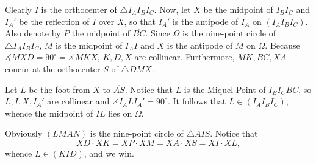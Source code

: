 Clearly $I$ is the orthocenter of $\triangle I_AI_BI_C$. Now, let $X$ be the midpoint of $\overline{I_BI_C}$ and $I_A'$ be the reflection of $I$ over $X$, so that $I_A'$ is the antipode of $I_A$ on $(I_AI_BI_C)$. Also denote by $P$ the midpoint of $\overline{BC}$. Since $\Omega$ is the nine-point circle of $\triangle I_AI_BI_C$, $M$ is the midpoint of $\overline{I_AI}$ and $X$ is the antipode of $M$ on $\Omega$. Because $\measuredangle MXD=90^\circ=\measuredangle MKX$, $K,D,X$ are collinear. Furthermore, $\overline{MK},\overline{BC},\overline{XA}$ concur at the orthocenter $S$ of $\triangle DMX$.

Let $L$ be the foot from $X$ to $\overline{AS}$. Notice that $L$ is the Miquel Point of $I_BI_CBC$, so $L,I,X,I_A'$ are collinear and $\measuredangle I_ALI_A'=90^\circ$. It follows that $L\in(I_AI_BI_C)$, whence the midpoint of $\overline{IL}$ lies on $\Omega$.

Obviously $(LMAN)$ is the nine-point circle of $\triangle AIS$. Notice that \[XD\cdot XK=XP\cdot XM=XA\cdot XS=XI\cdot XL,\]
whence $L\in(KID)$, and we win.
